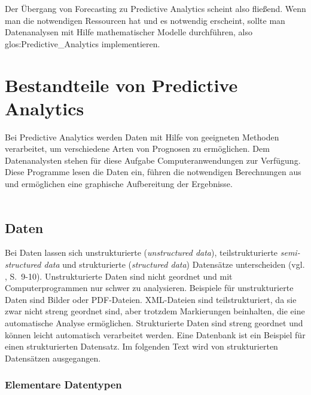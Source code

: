 Der Übergang von Forecasting zu Predictive Analytics scheint also fließend. Wenn man die notwendigen
Ressourcen hat und es notwendig erscheint, sollte man Datenanalysen mit Hilfe mathematischer Modelle
durchführen, also \gls{glos:Predictive_Analytics} implementieren.


\section{Bestandteile von Predictive Analytics}

Bei Predictive Analytics werden Daten mit Hilfe von geeigneten Methoden
verarbeitet, um verschiedene Arten von Prognosen zu ermöglichen. Dem
Datenanalysten stehen für diese Aufgabe Computeranwendungen zur Verfügung.
Diese Programme lesen die Daten ein, führen die notwendigen Berechnungen aus und
ermöglichen eine graphische Aufbereitung der Ergebnisse. \\ \\

\subsection{Daten}

Bei Daten lassen sich unstrukturierte (\emph{unstructured data}), teilstrukturierte
\emph{semi-structured data} und strukturierte (\emph{structured data}) Datensätze unterscheiden (vgl. \cite{McCarthy}, S.~9-10).
Unstrukturierte Daten sind nicht geordnet und mit Computerprogrammen nur schwer zu analysieren. Beispiele für unstrukturierte Daten
sind Bilder oder PDF-Dateien. XML-Dateien sind teilstrukturiert, da sie zwar nicht streng geordnet sind, aber trotzdem Markierungen
beinhalten, die eine automatische Analyse ermöglichen. Strukturierte Daten sind streng geordnet und können leicht automatisch verarbeitet
werden. Eine Datenbank ist ein Beispiel für einen strukturierten Datensatz. Im folgenden Text wird von strukturierten Datensätzen ausgegangen.

\subsubsection{Elementare Datentypen}
\label{Elem_Dat}

